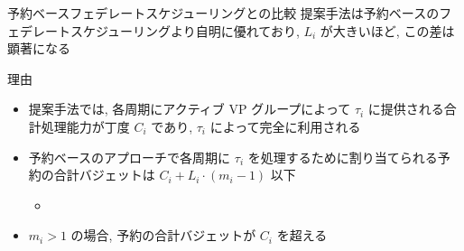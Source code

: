 \begin{frame}{予約ベースフェデレートスケジューリングとの比較}
    提案手法は予約ベースのフェデレートスケジューリング\cite{ueter2018reservation}より自明に優れており, $L_{i}$ が大きいほど, この差は顕著になる
    \begin{block}{理由}
        \setlength{\linewidth}{0.98\columnwidth}
        \begin{itemize}
            \item 提案手法では, 各周期にアクティブ VP グループによって $\tau_{i}$ に提供される合計処理能力が丁度 $C_{i}$ であり, $\tau_{i}$ によって完全に利用される
            \item 予約ベースのアプローチで各周期に $\tau_{i}$ を処理するために割り当てられる予約の合計バジェットは $C_{i}+L_{i} \cdot\left(m_{i}-1\right)$ 以下
                  \begin{itemize}
                      \item {}
                  \end{itemize}
            \item $m_{i}>1$ の場合, 予約の合計バジェットが $C_{i}$ を超える
        \end{itemize}
    \end{block}
\end{frame}
